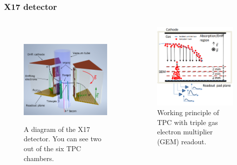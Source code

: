 \documentclass{beamer}
\begin{document}
	\begin{frame}
		\frametitle{X17 detector}
		\begin{columns}
				\begin{figure}
					\centering
					$ $\newline
					\includegraphics[width=0.81\linewidth]{images/diagram.png}\newline
					\caption{A diagram of the X17 detector. You can see two out of the six TPC chambers.\cite{poster}}
					\label{fig:dia}
				\end{figure}
				\begin{figure}
					\centering
					\includegraphics[width=0.82\linewidth]{images/diagram2.png}
					\caption{Working principle of TPC with triple gas electron multiplier (GEM) readout.\cite{poster}}
					\label{fig:dia2}
				\end{figure}
		\end{columns}
	\end{frame}
	
\end{document}
